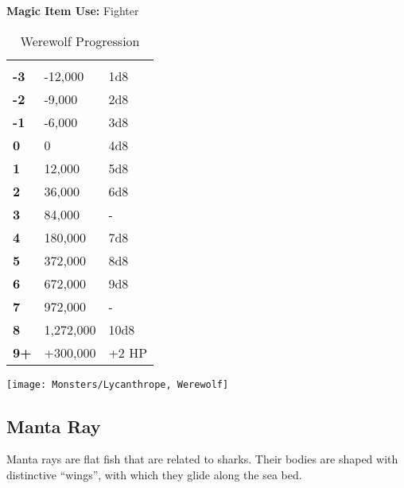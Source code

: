 \begin{multicols*}{2}
{\textbf{Magic Item Use:} Fighter}

\begin {table}[H]
	\caption{Werewolf Progression}
  \begin{tabularx}{\columnwidth}{>{\bfseries}YYY}
   &  & \\
	-3 & -12,000 & 1d8\\
	-2 & -9,000 & 2d8\\
	-1 & -6,000 & 3d8\\
	0 & 0 & 4d8\\
	1 & 12,000 & 5d8\\
	2 & 36,000 & 6d8\\
	3 & 84,000 & -\\
	4 & 180,000 & 7d8\\
	5 & 372,000 & 8d8\\
	6 & 672,000 & 9d8\\
	7 & 972,000 & -\\
	8 & 1,272,000 & 10d8\\
	9+ & +300,000 & +2 HP
  \end {tabularx}
\end {table}

\texttt{[image: Monsters/Lycanthrope, Werewolf]}

\subsection{Manta Ray}

Manta rays are flat fish that are related to sharks. Their bodies are shaped with distinctive “wings”, with which they glide along the sea bed.


\end{multicols*}
